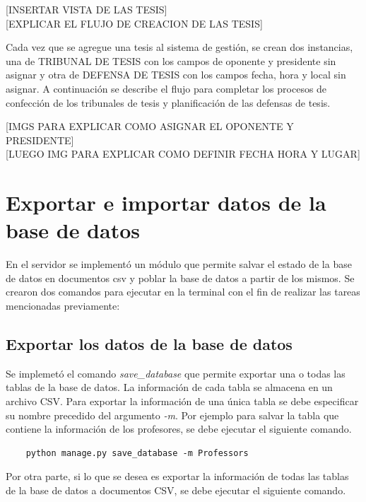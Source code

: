 [INSERTAR VISTA DE LAS TESIS] \\

[EXPLICAR EL FLUJO DE CREACION DE LAS TESIS]

Cada vez que se agregue una tesis al sistema de gestión, se crean dos instancias, 
una de TRIBUNAL DE TESIS con los campos de oponente y presidente sin asignar y otra 
de DEFENSA DE TESIS con los campos fecha, hora y local sin asignar. A continuación 
se describe el flujo para completar los procesos de confección de los tribunales de tesis
y planificación de las defensas de tesis.

[IMGS PARA EXPLICAR COMO ASIGNAR EL OPONENTE Y PRESIDENTE] \\

[LUEGO IMG PARA EXPLICAR COMO DEFINIR FECHA HORA Y LUGAR]





\section{Exportar e importar datos de la base de datos}

En el servidor se implementó un módulo 
que permite salvar el estado de la base de datos 
en documentos csv y poblar la base de datos a partir de los mismos.
Se crearon dos comandos para ejecutar en la terminal con el 
fin de realizar las tareas mencionadas previamente:

\subsection{Exportar los datos de la base de datos}

Se implemetó el comando \textit{save\_database}
que permite exportar una o todas las tablas de la base de datos.
La información de cada tabla se almacena en un archivo CSV.
Para exportar la información de una única tabla
se debe especificar su nombre precedido del argumento \textit{-m}. Por 
ejemplo para salvar la tabla que contiene la información de los profesores, se debe 
ejecutar el siguiente comando.

\begin{verbatim}
    python manage.py save_database -m Professors
\end{verbatim}


Por otra parte, si lo que se desea es exportar la información de todas las tablas 
de la base de datos a documentos CSV, se debe ejecutar el siguiente comando.

